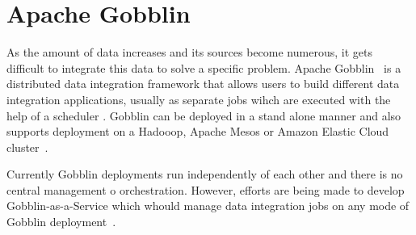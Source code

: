 \section{Apache Gobblin}

As the amount of data increases and its sources become numerous, it
gets difficult to integrate this data to solve a specific
problem. Apache Gobblin~\cite{hid-sp18-503-www-gobblin} is a distributed
data integration framework that allows users to build different data
integration applications, usually as separate jobs wihch are executed
with the help of a scheduler
\cite{hid-sp18-503-www-gobblin-docs}. Gobblin can be deployed in a
stand alone manner and also supports deployment on a Hadooop, Apache
Mesos or Amazon Elastic Cloud cluster~\cite{hid-sp18-503-www-gobblin}.

Currently Gobblin deployments run independently of each other and
there is no central management o orchestration. However, efforts are
being made to develop Gobblin-as-a-Service which whould manage data
integration jobs on any mode of Gobblin 
deployment~\cite{hid-sp18-503-www-gobblin-docs}.
